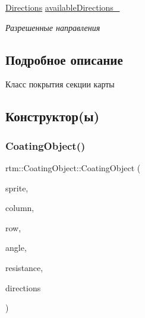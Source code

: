 \begin{DoxyCompactItemize}
\mbox{\label{classrtm_1_1_coating_object_ad542a00f5a714fee4f8ebc30e76746cc}} 
\hyperlink{namespacertm_a4776fbfe59834ff1a16838ad6735b69a}{Directions} \hyperlink{classrtm_1_1_coating_object_ad542a00f5a714fee4f8ebc30e76746cc}{available\+Directions\+\_\+}
\begin{DoxyCompactList}\small\item\em Разрешенные направления \end{DoxyCompactList}\end{DoxyCompactItemize}


\subsection{Подробное описание}
Класс покрытия секции карты 

\subsection{Конструктор(ы)}
\mbox{\label{classrtm_1_1_coating_object_a4d5d7ecc1ba34ec9f2d29dd39c1c054f}} 
\subsubsection{\texorpdfstring{Coating\+Object()}{CoatingObject()}\hspace{0.1cm}{\footnotesize\ttfamily [1/2]}}
{\footnotesize\ttfamily rtm\+::\+Coating\+Object\+::\+Coating\+Object (\begin{DoxyParamCaption}\item[{cocos2d\+::\+Sprite $\ast$const}]{sprite,  }\item[{int}]{column,  }\item[{int}]{row,  }\item[{\hyperlink{namespacertm_a69dc82b16a0148c10962caa83d930f89}{Angle\+Type}}]{angle,  }\item[{float}]{resistance,  }\item[{\hyperlink{namespacertm_a4776fbfe59834ff1a16838ad6735b69a}{Directions}}]{directions }\end{DoxyParamCaption})}

